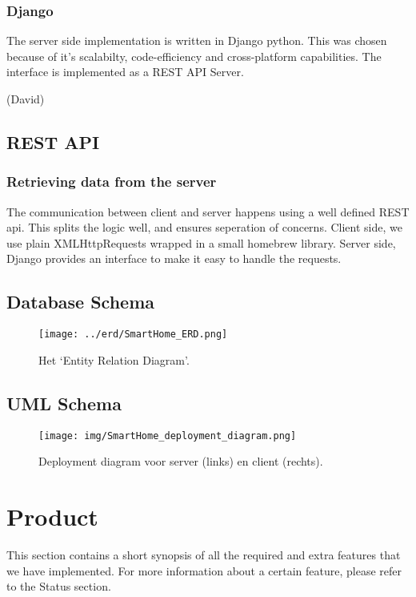 \documentclass[11pt]{article}
\begin{document}
	\subsubsection{Django}
		The server side implementation is written in Django python. This was chosen because of it's scalabilty, code-efficiency and cross-platform capabilities. The interface is implemented as a REST API Server.
		
		(David)

  \subsection{REST API}
	\subsubsection{Retrieving data from the server}
		The communication between client and server happens using a well defined REST api. This splits the logic well, and ensures seperation of concerns.
		Client side, we use plain XMLHttpRequests wrapped in a small homebrew library. Server side, Django provides an interface to make it easy to handle the requests.

  \subsection{Database Schema}
  \begin{figure}[H]
  \centering
    \texttt{[image: ../erd/SmartHome\_ERD.png]}
  \caption{Het `Entity Relation Diagram'.}
  \label{fig:erd}
  \end{figure}
  
  \subsection{UML Schema}
  \begin{figure}[H]
  \centering
    \texttt{[image: img/SmartHome\_deployment\_diagram.png]}
  \caption{Deployment diagram voor server (links) en client (rechts).}
  \label{fig:uml}
  \end{figure}

\section{Product}
	This section contains a short synopsis of all the required and extra features that we have implemented.
	For more information about a certain feature, please refer to the Status section.
\end{document}
